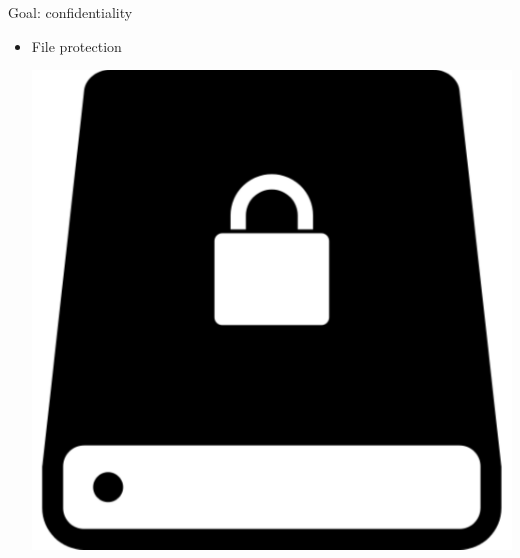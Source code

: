 \documentclass[aspectratio=169, lualatex, handout, 10pt,dvipsnames,svgnames]{beamer} %
\begin{document}
\begin{frame}{Goal: confidentiality}
\begin{itemize}
  \item File protection
    \begin{center}
      \includegraphics[scale=0.1]{Images/file-protection.pdf}
    \end{center}
  \end{itemize}
\end{frame}
\end{document}
